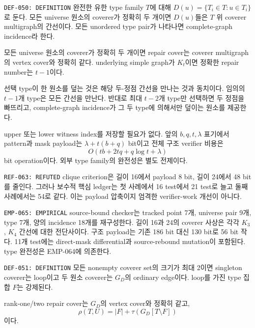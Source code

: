\documentclass[11pt]{article}
\begin{document}
{\texttt{DEF-050: DEFINITION}}
완전한 유한 type family \(T\)에 대해
\(D(u)=\{T_i\in T:u\in T_i\}\)로 둔다. 모든 universe 원소의 coverer가
정확히 두 개이면 \(D(u)\)들은 \(T\) 위 coverer multigraph의 간선이다.
모든 unordered type pair가 나타나면 complete-graph incidence라 한다.

{}
모든 universe 원소의 coverer가 정확히 두 개이면 repair cover는
coverer multigraph의 vertex cover와 정확히 같다. underlying simple
graph가 \(K_t\)이면 정확한 repair number는 \(t-1\)이다.

\begin{claimproof}
선택 type이 한 원소를 덮는 것은 해당 두-정점 간선을 만나는 것과
동치이다. 임의의 \(t-1\)개 type은 모든 간선을 만난다. 반대로
최대 \(t-2\)개 type만 선택하면 두 정점을 빠뜨리고, complete-graph
incidence가 그 두 type에 의해서만 덮이는 원소를 제공한다.

upper 또는 lower witness index를 저장할 필요가 없다. 앞의
\(b,q,t,\lambda\) 표기에서 pattern과 mask payload는
\(\lambda+t(b+q)\) bit이고 전체 구조 verifier 비용은
\[
 O(tb+2tq+q\log t+\lambda)
\]
bit operation이다. 외부 type family의 완전성은 별도 전제이다.
\end{claimproof}

{\texttt{REF-063: REFUTED}}
clique criterion은 길이 16에서 payload 8 bit, 길이 24에서 48 bit를
줄인다. 그러나 보수적 핵심 ledger는 첫 사례에서 16 test에서 21
test로 늘고 둘째 사례에서는 54로 같다. 이는 payload 압축이지
엄격한 verifier-work 개선이 아니다.

{\texttt{EMP-065: EMPIRICAL}}
source-bound checker는 tracked point 7개, universe pair 9개, type 7개,
양의 incidence 18개를 재구성한다. 길이 16과 24의 coverer 사상은 각각
\(K_3\), \(K_4\) 간선에 대한 전단사이다. 구조 payload는 기존 186
bit 대신 130 bit로 56 bit 작다. 11개 test에는 direct-mask
differential과 source-rebound mutation이 포함된다. type 완전성은
EMP-064에 의존한다.

{\texttt{DEF-051: DEFINITION}}
모든 nonempty coverer set의 크기가 최대 2이면 singleton coverer는
loop이고 두 원소 coverer는 \(G_D\)의 ordinary edge이다. loop를 가진
type 집합 \(F\)는 강제된다.

{}
rank-one/two repair cover는 \(G_D\)의 vertex cover와 정확히 같고,
\[
 \rho(T,U)=|F|+\tau\!\left(G_D[T\setminus F]\right)
\]
이다.
\end{document}
